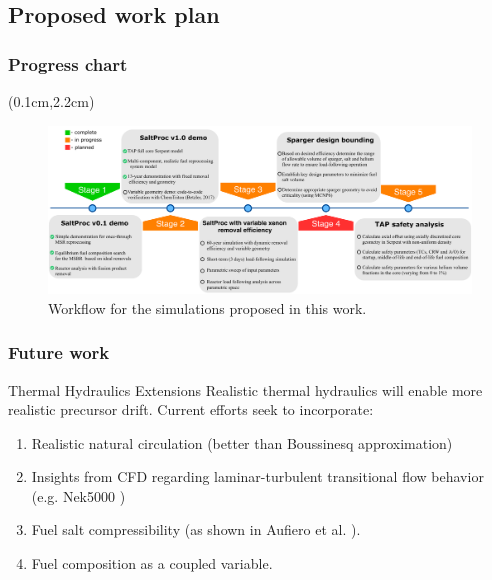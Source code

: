 \subsection{Proposed work plan}

\begin{frame}
  \frametitle{Progress chart}       
  	  \begin{textblock*}{12.5cm}(0.1cm,2.2cm) %
 \begin{figure}[ht!] %
	\includegraphics[width=\textwidth]{./images/progress_chart.pdf} 
	\caption{Workflow for the simulations proposed in this work.}
\end{figure}
		\end{textblock*}
\end{frame}

\begin{frame}
  \frametitle{Future work}       
              \begin{block}{Thermal Hydraulics Extensions}
               Realistic thermal hydraulics will enable more realistic 
                      precursor drift.  Current efforts seek to incorporate:
               \begin{enumerate}
                \item Realistic natural circulation (better than Boussinesq approximation)
                \item Insights from \gls{CFD}
                        regarding laminar-turbulent transitional flow behavior  
                               (e.g. Nek5000 \cite{obabko_verification_2015}) 
               \item Fuel salt compressibility (as shown in Aufiero et 
                               al. \cite{aufiero_monte_2017}).
               \item Fuel composition as a coupled variable.
               \end{enumerate}
               \end{block}
\end{frame}


